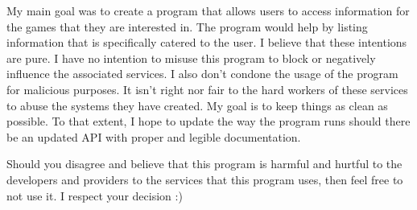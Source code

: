 My main goal was to create a program that allows users to access
information for the games that they are interested in. The program
would help by listing information that is specifically catered to the user.
I believe that these intentions are pure. I have no intention to
misuse this program to block or negatively influence the associated
services. I also don't condone the usage of the program for malicious
purposes. It isn't right nor fair to the hard workers of these
services to abuse the systems they have created. My goal is to keep
things as clean as possible. To that extent, I hope to update the way
the program runs should there be an updated API with proper and
legible documentation.

Should you disagree and believe that this program is harmful and
hurtful to the developers and providers to the services that this
program uses, then feel free to not use it. I respect your decision :)

